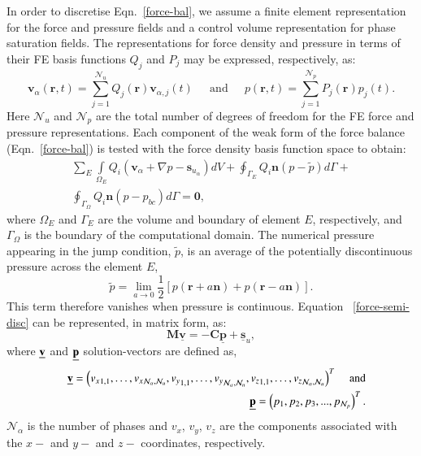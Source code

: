 \documentclass[preprint,authoryear,12pt]{elsarticle}
\begin{document}
In order to discretise Eqn.~\ref{force-bal}, we assume a finite element representation for the force and pressure fields and a control volume representation for phase saturation fields. The representations for force density and pressure in terms of their FE basis functions $Q_{j}$ and $P_{j}$  may be expressed, respectively, as:
\begin{displaymath}
  \mathbf{v}_\alpha(\bm{r},t) = \sum\limits_{j=1}^{\mathcal{N}_u} Q_{j}(\bm{r})\mathbf{v}_{\alpha,j}(t) \;\;\;\;\text{ and } \;\;\;\; p(\bm{r},t)  = \sum\limits_{j=1}^{\mathcal{N}_p} P_{j}(\bm{r})p_{j}(t).
\end{displaymath} 
Here $\mathcal{N}_{u}$ and $\mathcal{N}_{p}$ are the total number of degrees of freedom for the FE force and pressure representations. Each component of the weak form of the force balance (Eqn.~\ref{force-bal}) is tested with the force density basis function space to obtain:
\begin{eqnarray}
  \sum\limits_{E} \left. \int\limits_{\Omega_E} { {Q}}_i
   \left ( {\mathbf v}_\alpha + \nabla p
  -{\mathbf s}_{u_\alpha} \right) dV \right. + \displaystyle
  \oint_{\Gamma_{E}} {Q}_i {\mathbf n} \left(p - \tilde{p}\right) d\Gamma
  + \nonumber \\ 
  \oint_{\Gamma_{\Omega}} { Q}_i {\mathbf n} \left(p -
  p_{bc}\right) d\Gamma = \bm{0},
  \label{force-semi-disc} 
\end{eqnarray} 
where $\Omega_E$ and $\Gamma_{E}$ are the volume and boundary of element $E$, respectively, and $\Gamma_{\Omega}$ is the boundary of the computational domain. The numerical pressure appearing in the jump condition, $\tilde{p}$, is an average of the potentially discontinuous pressure across the element $E$,
\[\tilde{p}=\lim_{a\rightarrow 0} 
   \frac{1}{2}\left[p(\bm{r}+a\bm{n})+p(\bm{r}-a\bm{n})\right].\] This term therefore vanishes when pressure is continuous. Equation ~\ref{force-semi-disc} can be represented, in matrix form, as:
\begin{equation}
  {\mathbf M} \underline {\mathbf v} = -{\mathbf C} \underline {\mathbf p} + \underline {\mathbf s}_{u}, \label{force-balance-matrix-form}
\end{equation}
where $\underline{\bf v}$ and $\underline{\bf p}$ solution-vectors are defined as,
\begin{eqnarray}
  &&\underline{{\bf v}} = \left({v_x}_{1,1},\ldots,{v_x}_{\mathcal{N}_\alpha,
    \mathcal{N}_u}, {v_y}_{1,1},\ldots,{v_y}_{\mathcal{N}_\alpha,
    \mathcal{N}_u},{v_z}_{1,1},\ldots,{v_z}_{\mathcal{N}_\alpha,
    \mathcal{N}_u}\right)^{T} \;\;\;\;\text{and} \nonumber \\ &&
  \underline{{\bf p}} = \left(p_1, p_2, p_3, ...,
  p_{\mathcal{N}_p}\right)^T. \nonumber \nonumber
\end{eqnarray}
$\mathcal{N}_{\alpha}$ is the number of phases and $v_x$, $v_y$, $v_z$ are the components associated with the $x-$ and $y-$ and $z-$ coordinates, respectively. 
\end{document}
